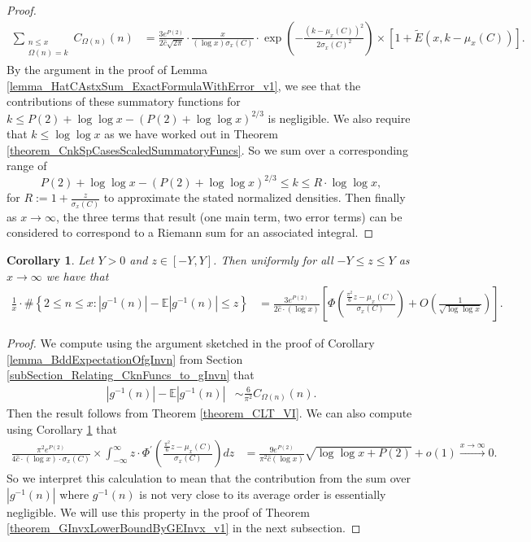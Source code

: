 \documentclass[11pt,reqno,a4letter]{article}
\numberwithin{figure}{section}
\numberwithin{table}{section}
\theoremstyle{plain}
\newtheorem{cor}[theorem]{Corollary}
\numberwithin{theorem}{section}
\theoremstyle{definition}
\begin{document}
\begin{proof}
\begin{align*}
\sum_{\substack{n \leq x \\ \Omega(n)=k}} C_{\Omega(n)}(n) & = 
     \frac{3 e^{P(2)}}{2\hat{c} \sqrt{2\pi}} \cdot \frac{x}{(\log x) \sigma_x(C)} 
     \cdot \exp\left(-\frac{\left(k-\mu_x(C)\right)^2}{2\sigma_x(C)^2}\right) \times 
     \left[1 + \widetilde{E}(x, k - \mu_x(C))\right]. 
\end{align*} 
By the argument in the proof of 
Lemma \ref{lemma_HatCAstxSum_ExactFormulaWithError_v1}, we see that 
the contributions of these summatory functions for 
$k \leq P(2) + \log\log x - (P(2) + \log\log x)^{2/3}$ is negligible. 
We also require that $k \leq \log\log x$ as we have worked out in 
Theorem \ref{theorem_CnkSpCasesScaledSummatoryFuncs}. So we sum over a 
corresponding range of 
\[
P(2) + \log\log x - (P(2) + \log\log x)^{2/3} \leq k \leq R \cdot \log\log x, 
\] 
for $R := 1 + \frac{z}{\sigma_x(C)}$ to approximate the 
stated normalized densities. 
Then finally as $x \rightarrow \infty$, the 
three terms that result (one main term, two error terms) 
can be considered to correspond to a Riemann sum for an associated integral. 
\end{proof} 

\begin{cor} 
\label{cor_CLT_VII} 
Let $Y > 0$ and $z \in [-Y, Y]$. 
Then uniformly for all $-Y \leq z \leq Y$ as $x \rightarrow \infty$ 
we have that 
\begin{align*} 
\frac{1}{x} \cdot \#\left\{2 \leq n \leq x:|g^{-1}(n)| - 
     \mathbb{E}|g^{-1}(n)| \leq z\right\} & = 
     \frac{3 e^{P(2)}}{2\widehat{c} \cdot (\log x)} \left[ 
     \Phi\left(\frac{\frac{\pi^2}{6} z - \mu_x(C)}{\sigma_x(C)}\right) + 
     O\left(\frac{1}{\sqrt{\log\log x}}\right)\right]. 
\end{align*} 
\end{cor} 
\begin{proof} 
We compute using the argument sketched in the proof of 
Corollary \ref{lemma_BddExpectationOfgInvn} from 
Section \ref{subSection_Relating_CknFuncs_to_gInvn} that 
\begin{align*} 
|g^{-1}(n)| - \mathbb{E}|g^{-1}(n)| & \sim \frac{6}{\pi^2} C_{\Omega(n)}(n). 
\end{align*} 
Then the result follows from Theorem \ref{theorem_CLT_VI}. 
We can also compute using Corollary \ref{cor_CLT_VII} that 
\begin{align} 
\label{eqn_remark_ClosenessApproxgInvnByAvgOrder_v1} 
\frac{\pi^2 e^{P(2)}}{4 \hat{c} \cdot (\log x) \cdot \sigma_x(C)} \times 
     \int_{-\infty}^{\infty} 
     z \cdot \Phi^{\prime}\left(\frac{\frac{\pi^2}{6} z - \mu_x(C)}{\sigma_x(C)}\right) dz & = 
     \frac{9 e^{P(2)}}{\pi^2 \hat{c} (\log x)}  \sqrt{\log\log x + P(2)} + o(1) 
     \xrightarrow{x \rightarrow \infty} 0. 
\end{align} 
So we interpret this calculation to mean that the contribution from the sum 
over $|g^{-1}(n)|$ where $g^{-1}(n)$ is not very close to its average order is essentially 
negligible. We will use this property in the proof of 
Theorem \ref{theorem_GInvxLowerBoundByGEInvx_v1} in the next subsection. 
\end{proof} 
\end{document}
